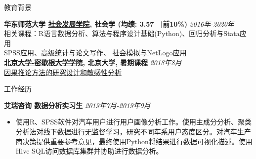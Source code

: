 \documentclass{resume} %
\begin{document}
\thispagestyle{empty}
\begin{rSection}{\noindent 教育背景}
\begin{spacing}{0.1} 
{\bf 华东师范大学 \href{http://www.soci.ecnu.edu.cn/}{社会发展学院}, 社会学  (均绩: 3.57 \ |前10\%)
} \hfill {\em 2016年-2020年} \\
相关课程：R语言数据分析、算法与程序设计基础(Python)、回归分析与Stata应用\\
SPSS应用、高级统计与论文写作、 社会模拟与NetLogo应用 \\
{\bf \href{http://www.oir.pku.edu.cn/umich/jxsz1/nsqkczsjz2018.htm}{北京大学-密歇根大学学院}, 北京大学, 暑期课程} \hfill{\em 2018年8月} \\
\href{http://www.oir.pku.edu.cn/umich/jxsz1/nsqkczsjz2018.htm}{因果推论方法的研究设计和敏感性分析}
\end{spacing}
\end{rSection} 

\begin{rSection}{\noindent 工作经历}
\begin{spacing}{0.5}  
{\bf 艾瑞咨询 \quad 数据分析实习生} \hfill{\em 2019年7月-2019年9月} 
\begin{itemize}
 \item	使用R、SPSS软件对汽车用户进行用户画像分析工作。使用主成分分析、聚类分析法对线下数据进行无监督学习，研究不同车系用户态度区分。对汽车生产商决策提供重要参考意见，最终使用Python将结果进行数据可视化描述。使用Hive SQL访问数据库集群并协助进行数据分析。
\end{itemize}
\end{spacing}
\end{rSection}
\end{document}
